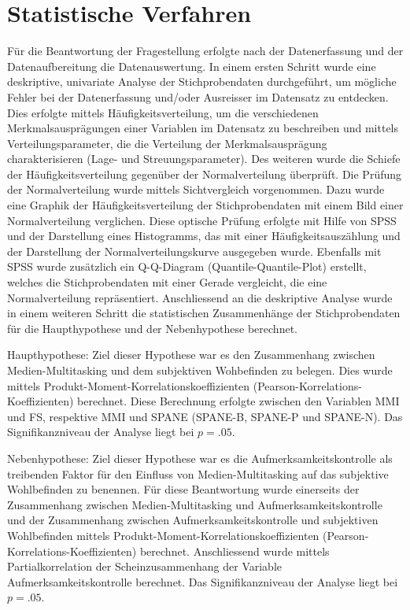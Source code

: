 \section{Statistische Verfahren}\label{section.statistischeVerfahren}
Für die Beantwortung der Fragestellung erfolgte nach der Datenerfassung und der Datenaufbereitung die Datenauswertung. In einem ersten Schritt wurde eine deskriptive, univariate Analyse der Stichprobendaten durchgeführt, um mögliche Fehler bei der Datenerfassung und/oder Ausreisser im Datensatz zu entdecken. Dies erfolgte mittels Häufigkeitsverteilung, um die verschiedenen Merkmalsausprägungen einer Variablen im Datensatz zu beschreiben und mittels Verteilungsparameter, die die Verteilung der Merkmalsausprägung charakterisieren (Lage- und Streuungsparameter). Des weiteren wurde die Schiefe der Häufigkeitsverteilung gegenüber der Normalverteilung überprüft. Die Prüfung der Normalverteilung wurde mittels Sichtvergleich vorgenommen. Dazu wurde eine Graphik der Häufigkeitsverteilung der Stichprobendaten mit einem Bild einer Normalverteilung verglichen. Diese optische Prüfung erfolgte mit Hilfe von SPSS und der Darstellung eines Histogramms, das mit einer Häufigkeitsauszählung und der Darstellung der Normalverteilungskurve ausgegeben wurde. Ebenfalls mit SPSS wurde zusätzlich ein Q-Q-Diagram (Quantile-Quantile-Plot) erstellt, welches die Stichprobendaten mit einer Gerade vergleicht, die eine Normalverteilung repräsentiert. Anschliessend an die deskriptive Analyse wurde in einem weiteren Schritt die statistischen Zusammenhänge der Stichprobendaten für die Haupthypothese und der Nebenhypothese berechnet. \par 
Haupthypothese: Ziel dieser Hypothese war es den Zusammenhang zwischen Medien-Multitasking und dem subjektiven Wohbefinden zu belegen. Dies wurde mittels Produkt-Moment-Korrelationskoeffizienten (Pearson-Korrelations-Koeffizienten) berechnet. Diese Berechnung erfolgte zwischen den Variablen MMI und FS, respektive MMI und SPANE (SPANE-B, SPANE-P und SPANE-N).  Das Signifikanzniveau der Analyse liegt bei $p=.05$. \par
Nebenhypothese: Ziel dieser Hypothese war es die Aufmerksamkeitskontrolle als treibenden Faktor für den Einfluss von Medien-Multitasking auf das subjektive Wohlbefinden zu benennen. Für diese Beantwortung wurde einerseits der Zusammenhang zwischen Medien-Multitasking und Aufmerksamkeitskontrolle und der Zusammenhang zwischen Aufmerksamkeitskontrolle und subjektiven Wohlbefinden mittels Produkt-Moment-Korrelationskoeffizienten (Pearson-Korrelations-Koeffizienten) berechnet. Anschliessend wurde mittels Partialkorrelation der Scheinzusammenhang der Variable Aufmerksamkeitskontrolle berechnet. Das Signifikanzniveau der Analyse liegt bei $p=.05$.







